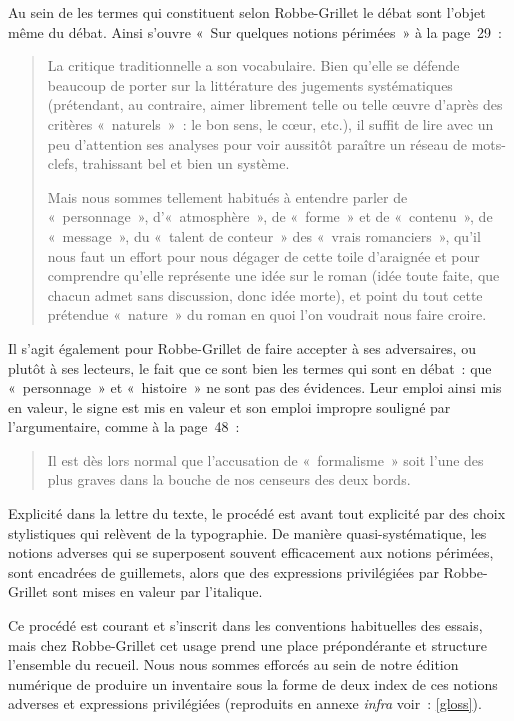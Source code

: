 \documentclass[12pt, a4paper]{article}
\begin{document}
Au sein de \punr{}  les termes qui constituent selon Robbe-Grillet le débat sont l'objet même du débat. Ainsi s'ouvre «~Sur quelques notions périmées~» à la page~29~:
\begin{quote}
    La critique traditionnelle a son vocabulaire. Bien qu’elle se défende beaucoup de porter sur la littérature des jugements systématiques (prétendant, au contraire, aimer librement telle ou telle œuvre d’après des critères «~naturels~»~: le bon sens, le cœur, etc.), il suffit de lire avec un peu d’attention ses analyses pour voir aussitôt paraître un réseau de mots-clefs, trahissant bel et bien un système.

    Mais nous sommes tellement habitués à entendre parler de «~personnage~», d’«~atmosphère~», de «~forme~» et de «~contenu~», de «~message~», du «~talent de conteur~» des «~vrais romanciers~», qu’il nous faut un effort pour nous dégager de cette toile d’araignée et pour comprendre qu’elle représente une idée sur le roman (idée toute faite, que chacun admet sans discussion, donc idée morte), et point du tout cette prétendue «~nature~» du roman en quoi l’on voudrait nous faire croire.
\end{quote}
Il s'agit également pour Robbe-Grillet de faire accepter à ses adversaires, ou plutôt à ses lecteurs, le fait que ce sont bien les termes qui sont en débat~: que «~personnage~» et «~histoire~» ne sont pas des évidences. Leur emploi ainsi mis en valeur, le signe est mis en valeur et son emploi impropre souligné par l'argumentaire, comme à la page~48~:
\begin{quote}
    Il est dès lors normal que l'accusation de «~formalisme~» soit l'une des plus graves dans la bouche de nos censeurs des deux bords.
\end{quote}

Explicité dans la lettre du texte, le procédé est avant tout explicité par des choix stylistiques qui relèvent de la typographie. De manière quasi-systématique, les notions adverses qui se superposent souvent efficacement aux notions périmées, sont encadrées de guillemets, alors que des expressions privilégiées par Robbe-Grillet sont mises en valeur par l'italique.

Ce procédé est courant et s'inscrit dans les conventions habituelles des essais, mais chez Robbe-Grillet cet usage prend une place prépondérante et structure l'ensemble du recueil. Nous nous sommes efforcés au sein de notre édition numérique de produire un inventaire sous la forme de deux index de ces notions adverses et expressions privilégiées (reproduits en annexe \textit{infra} voir~: \ref{gloss}).
\end{document}
